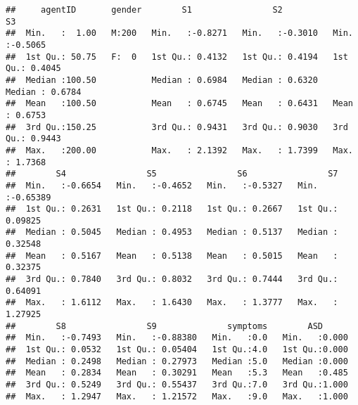 \documentclass[]{article}
\newenvironment{Shaded}{\begin{snugshade}}{\end{snugshade}}
\newcommand{\KeywordTok}[1]{\textcolor[rgb]{0.13,0.29,0.53}{\textbf{#1}}}
\newcommand{\StringTok}[1]{\textcolor[rgb]{0.31,0.60,0.02}{#1}}
\newcommand{\CommentTok}[1]{\textcolor[rgb]{0.56,0.35,0.01}{\textit{#1}}}
\newcommand{\OperatorTok}[1]{\textcolor[rgb]{0.81,0.36,0.00}{\textbf{#1}}}
\newcommand{\AlertTok}[1]{\textcolor[rgb]{0.94,0.16,0.16}{#1}}
\newcommand{\NormalTok}[1]{#1}
\begin{document}
\begin{Shaded}
\end{Shaded}

\begin{verbatim}
##     agentID       gender        S1                S2                S3         
##  Min.   :  1.00   M:200   Min.   :-0.8271   Min.   :-0.3010   Min.   :-0.5065  
##  1st Qu.: 50.75   F:  0   1st Qu.: 0.4132   1st Qu.: 0.4194   1st Qu.: 0.4045  
##  Median :100.50           Median : 0.6984   Median : 0.6320   Median : 0.6784  
##  Mean   :100.50           Mean   : 0.6745   Mean   : 0.6431   Mean   : 0.6753  
##  3rd Qu.:150.25           3rd Qu.: 0.9431   3rd Qu.: 0.9030   3rd Qu.: 0.9443  
##  Max.   :200.00           Max.   : 2.1392   Max.   : 1.7399   Max.   : 1.7368  
##        S4                S5                S6                S7          
##  Min.   :-0.6654   Min.   :-0.4652   Min.   :-0.5327   Min.   :-0.65389  
##  1st Qu.: 0.2631   1st Qu.: 0.2118   1st Qu.: 0.2667   1st Qu.: 0.09825  
##  Median : 0.5045   Median : 0.4953   Median : 0.5137   Median : 0.32548  
##  Mean   : 0.5167   Mean   : 0.5138   Mean   : 0.5015   Mean   : 0.32375  
##  3rd Qu.: 0.7840   3rd Qu.: 0.8032   3rd Qu.: 0.7444   3rd Qu.: 0.64091  
##  Max.   : 1.6112   Max.   : 1.6430   Max.   : 1.3777   Max.   : 1.27925  
##        S8                S9              symptoms        ASD       
##  Min.   :-0.7493   Min.   :-0.88380   Min.   :0.0   Min.   :0.000  
##  1st Qu.: 0.0532   1st Qu.: 0.05404   1st Qu.:4.0   1st Qu.:0.000  
##  Median : 0.2498   Median : 0.27973   Median :5.0   Median :0.000  
##  Mean   : 0.2834   Mean   : 0.30291   Mean   :5.3   Mean   :0.485  
##  3rd Qu.: 0.5249   3rd Qu.: 0.55437   3rd Qu.:7.0   3rd Qu.:1.000  
##  Max.   : 1.2947   Max.   : 1.21572   Max.   :9.0   Max.   :1.000
\end{verbatim}
\end{document}
